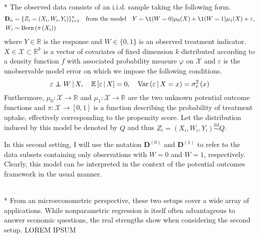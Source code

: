 \begin{boxD}
	\begin{asm}\label{asm:hte_dgp}\mbox{}\\*
		The observed data consists of an i.i.d. sample taking the following form.
		\begin{equation}\label{DGP2}
			\begin{aligned}
				\mathbf{D}_n & = \{Z_{i} = (X_{i}, W_{i}, Y_{i})\}_{i = 1}^{n}
				\quad \text{from the model} \quad
				Y = \1(W = 0)\mu_{0}(X) + \1(W = 1)\mu_1(X) + \varepsilon,	\\
				W_{i} & \sim \operatorname{Bern}\left(\pi\left(X_{i}\right)\right)
			\end{aligned}
		\end{equation}
		where $Y \in \mathbb{R}$ is the response and $W \in \{0,1\}$ is an observed treatment indicator.
		$X \in \mathcal{X} \subset \mathbb{R}^k$ is a vector of covariates of fixed dimension $k$ distributed according to a density function $f$ with associated probability measure $\varphi$ on $\mathcal{X}$ and $\varepsilon$ is the unobservable model error on which we impose the following conditions.
		\begin{equation}
			\varepsilon \perp\!\!\!\!\perp W \, | \, X, \quad
			\mathbb{E}\left[\varepsilon \, | \, X\right] = 0, \quad
			\text{Var}\left(\varepsilon \, | \, X = x\right) = \sigma_{\varepsilon}^2\left(x\right)
		\end{equation}
		Furthermore, $\mu_0:\mathcal{X} \rightarrow \mathbb{R}$ and $\mu_1:\mathcal{X} \rightarrow \mathbb{R}$ are the two unknown potential outcome functions and $\pi:\mathcal{X} \rightarrow [0,1]$ is a function describing the probability of treatment uptake, effectively corresponding to the propensity score.
		Let the distribution induced by this model be denoted by $Q$ and thus $Z_{i} = \left(X_{i}, W_{i}, Y_{i}\right) \overset{\text{iid}}{\sim} Q$.
	\end{asm}
\end{boxD}
In this second setting, I will use the notation $\mathbf{D}^{(0)}$ and $\mathbf{D}^{(1)}$ to refer to the data subsets containing only observations with $W = 0$ and $W = 1$, respectively.
Clearly, this model can be interpreted in the context of the potential outcomes framework in the usual manner.
\begin{boxD}
	\begin{rmk}\mbox{}\\*
		From an microeconometric perspective, these two setups cover a wide array of applications.
		While nonparametric regression is itself often advantageous to answer economic questions, the real strengths show when considering the second setup.
		{\color{red} LOREM IPSUM}
	\end{rmk}
\end{boxD}
